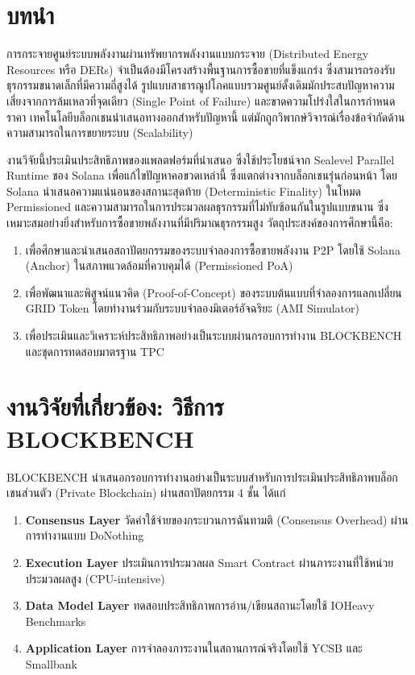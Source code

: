 \documentclass[conference,10pt]{IEEEtran}
\begin{document}
\section{บทนำ}
การกระจายศูนย์ระบบพลังงานผ่านทรัพยากรพลังงานแบบกระจาย (Distributed Energy Resources หรือ DERs) จำเป็นต้องมีโครงสร้างพื้นฐานการซื้อขายที่แข็งแกร่ง ซึ่งสามารถรองรับธุรกรรมขนาดเล็กที่มีความถี่สูงได้ \cite{b2} รูปแบบสาธารณูปโภคแบบรวมศูนย์ดั้งเดิมมักประสบปัญหาความเสี่ยงจากการล้มเหลวที่จุดเดียว (Single Point of Failure) และขาดความโปร่งใสในการกำหนดราคา เทคโนโลยีบล็อกเชนนำเสนอทางออกสำหรับปัญหานี้ แต่มักถูกวิพากษ์วิจารณ์เรื่องข้อจำกัดด้านความสามารถในการขยายระบบ (Scalability) \cite{b4}

งานวิจัยนี้ประเมินประสิทธิภาพของแพลตฟอร์มที่นำเสนอ ซึ่งใช้ประโยชน์จาก Sealevel Parallel Runtime ของ Solana \cite{b3} เพื่อแก้ไขปัญหาคอขวดเหล่านี้ ซึ่งแตกต่างจากบล็อกเชนรุ่นก่อนหน้า โดย Solana นำเสนอความแน่นอนของสถานะสุดท้าย (Deterministic Finality) ในโหมด Permissioned และความสามารถในการประมวลผลธุรกรรมที่ไม่ทับซ้อนกันในรูปแบบขนาน ซึ่งเหมาะสมอย่างยิ่งสำหรับการซื้อขายพลังงานที่มีปริมาณธุรกรรมสูง วัตถุประสงค์ของการศึกษานี้คือ:
\begin{enumerate}
    \item เพื่อศึกษาและนำเสนอสถาปัตยกรรมของระบบจำลองการซื้อขายพลังงาน P2P โดยใช้ Solana (Anchor) ในสภาพแวดล้อมที่ควบคุมได้ (Permissioned PoA)
    \item เพื่อพัฒนาและพิสูจน์แนวคิด (Proof-of-Concept) ของระบบต้นแบบที่จำลองการแลกเปลี่ยน GRID Token โดยทำงานร่วมกับระบบจำลองมิเตอร์อัจฉริยะ (AMI Simulator)
    \item เพื่อประเมินและวิเคราะห์ประสิทธิภาพอย่างเป็นระบบผ่านกรอบการทำงาน BLOCKBENCH และชุดการทดสอบมาตรฐาน TPC
\end{enumerate}

\section{งานวิจัยที่เกี่ยวข้อง: วิธีการ BLOCKBENCH}
BLOCKBENCH \cite{b4} นำเสนอกรอบการทำงานอย่างเป็นระบบสำหรับการประเมินประสิทธิภาพบล็อกเชนส่วนตัว (Private Blockchain) ผ่านสถาปัตยกรรม 4 ชั้น ได้แก่

\begin{enumerate}
    \item \textbf{Consensus Layer} วัดค่าใช้จ่ายของกระบวนการฉันทามติ (Consensus Overhead) ผ่านการทำงานแบบ DoNothing
    \item \textbf{Execution Layer} ประเมินการประมวลผล Smart Contract ผ่านภาระงานที่ใช้หน่วยประมวลผลสูง (CPU-intensive)
    \item \textbf{Data Model Layer} ทดสอบประสิทธิภาพการอ่าน/เขียนสถานะโดยใช้ IOHeavy Benchmarks
    \item \textbf{Application Layer} การจำลองภาระงานในสถานการณ์จริงโดยใช้ YCSB และ Smallbank
\end{enumerate}
\end{document}
